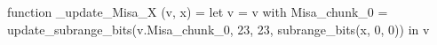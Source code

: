 function _update_Misa_X (v, x) = let v = { v with Misa_chunk_0 = update_subrange_bits(v.Misa_chunk_0, 23, 23, subrange_bits(x, 0, 0)) } in
  v
